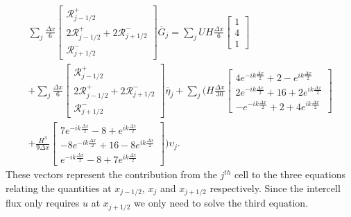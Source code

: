 \begin{multline*}
\sum_j \frac{\Delta x}{6}\begin{bmatrix} \mathcal{R}^+_{j -1/2} \\2 \mathcal{R}^+_{j -1/2} +2 \mathcal{R}^-_{j +1/2}\\ \mathcal{R}^-_{j +1/2} \end{bmatrix} \overline{G}_{j} = \sum_jUH \frac{\Delta x}{6}\begin{bmatrix} 1 \\4 \\ 1 \end{bmatrix}  \\+  \sum_j \frac{\Delta x}{6}\begin{bmatrix} \mathcal{R}^+_{j -1/2} \\2 \mathcal{R}^+_{j -1/2} +2 \mathcal{R}^-_{j +1/2}\\ \mathcal{R}^-_{j +1/2} \end{bmatrix} \overline{\eta}_{j}  + \sum_j \Bigg(H\frac{\Delta x}{30}\begin{bmatrix} 4e^{-ik\frac{\Delta x}{2}} +  2 - e^{ik\frac{\Delta x}{2}}\\2e^{-ik\frac{\Delta x}{2}}  + 16  +2 e^{ik\frac{\Delta x}{2}}  \\ -e^{-ik\frac{\Delta x}{2}} +  2 + 4e^{ik\frac{\Delta x}{2}} \end{bmatrix} \\+ \frac{H^3 }{9\Delta x}\begin{bmatrix} 7e^{-ik\frac{\Delta x}{2}} -8 + e^{ik\frac{\Delta x}{2}} \\ -8e^{-ik\frac{\Delta x}{2}} +  16  -8e^{ik\frac{\Delta x}{2}} \\ e^{-ik\frac{\Delta x}{2}} -8 + 7e^{ik\frac{\Delta x}{2}} \end{bmatrix}  \Bigg) \upsilon_j.
\end{multline*}
These vectors represent the contribution from the $j^{th}$ cell to the three equations relating the quantities at $x_{j-1/2}$, $x_j$ and $x_{j+1/2}$ respectively. Since the intercell flux only requires $u$ at $x_{j+1/2}$ we only need to solve the third equation.

